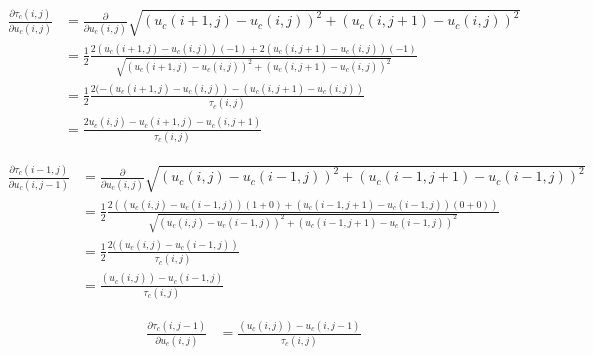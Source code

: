 \documentclass{paper}
\begin{document}
\begin{align}
	\frac{\partial{\tau_{c}\left(i,j\right)}}{\partial u_{c}\left(i,j\right)}
	&= \frac{\partial}{\partial{u_{c}\left(i,j\right)}} \sqrt{ \left(u_{c}(i+1,j) - u_{c}(i,j)\right)^2 + \left(u_{c}(i,j+1) - u_{c}(i,j)\right)^2} \\
	&= \frac{1}{2} \frac{2 (u_{c}(i+1,j)-u_{c}(i,j))(-1) + 2 (u_{c}(i,j+1)-u_{c}(i,j))(-1)}{\sqrt{ \left(u_{c}(i+1,j) - u_{c}(i,j)\right)^2 + \left(u_{c}(i,j+1) - u_{c}(i,j)\right)^2}} \\
	&= \frac{1}{2} \frac{2 (-(u_{c}(i+1,j)-u_{c}(i,j)) - (u_{c}(i,j+1)-u_{c}(i,j))}{\tau_{c}\left(i,j\right)} \\
	&= \frac{2 u_{c} \left(i,j\right) - u_{c} \left(i+1,j\right)-u_{c} \left(i,j+1\right)}{\tau_{c}\left(i,j\right)}
\end{align}

\begin{align}
	\frac{\partial{\tau_{c}\left(i-1,j\right)}}{\partial u_{c}\left(i,j-1\right)}
	&= \frac{\partial}{\partial{u_{c}\left(i,j\right)}} \sqrt{ \left(u_{c}(i,j) - u_{c}(i-1,j)\right)^2 + \left(u_{c}(i-1,j+1) - u_{c}(i-1,j)\right)^2} \\
	&= \frac{1}{2} \frac{2(\left(u_{c}(i,j) - u_{c}(i-1,j)\right)(1+0) + \left(u_{c}(i-1,j+1) - u_{c}(i-1,j)\right)(0+0))}{\sqrt{ \left(u_{c}(i,j) - u_{c}(i-1,j)\right)^2 + \left(u_{c}(i-1,j+1) - u_{c}(i-1,j)\right)^2}} \\
	&= \frac{1}{2} \frac{2(\left(u_{c}(i,j) - u_{c}(i-1,j)\right)}{\tau_{c}\left(i,j\right)} \\
	&= \frac{\left(u_{c}(i,j)\right)-u_{c} \left(i-1,j\right)}{\tau_{c}\left(i,j\right)}
\end{align}

\begin{align}
	\frac{\partial{\tau_{c}\left(i,j-1\right)}}{\partial u_{c}\left(i,j\right)}
	&= \frac{\left(u_{c}(i,j)\right)-u_{c} \left(i,j-1\right)}{\tau_{c}\left(i,j\right)}
\end{align}
\end{document}
